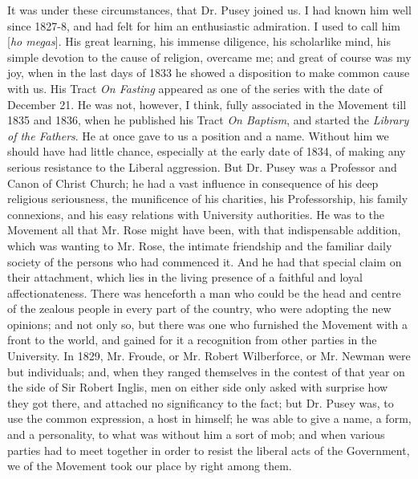 It was under these circumstances, that Dr. Pusey joined us. I had
known him well since 1827-8, and had felt for him an enthusiastic
admiration. I used to call him [\emph{ho megas}]. His great learning, his
immense diligence, his scholarlike mind, his simple devotion to the
cause of religion, overcame me; and great of course was my joy, when in
the last days of 1833 he showed a disposition to make common cause with
us. His Tract \emph{On Fasting} appeared as one of the series with the date of
December 21. He was not, however, I think, fully associated in the
Movement till 1835 and 1836, when he published his Tract \emph{On Baptism}, and
started the \emph{Library of the Fathers}. He at once gave to us a position and
a name. Without him we should have had little chance, especially
at the early date of 1834, of making any serious resistance to the
Liberal aggression. But Dr. Pusey was a Professor and Canon of Christ
Church; he had a vast influence in consequence of his deep religious
seriousness, the munificence of his charities, his Professorship, his
family connexions, and his easy relations with University authorities.
He was to the Movement all that Mr. Rose might have been, with that
indispensable addition, which was wanting to Mr. Rose, the intimate
friendship and the familiar daily society of the persons who had
commenced it. And he had that special claim on their attachment, which
lies in the living presence of a faithful and loyal affectionateness.
There was henceforth a man who could be the head and centre of the
zealous people in every part of the country, who were adopting the new
opinions; and not only so, but there was one who furnished the Movement
with a front to the world, and gained for it a recognition from other
parties in the University. In 1829, Mr. Froude, or Mr. Robert
Wilberforce, or Mr. Newman were but individuals; and, when they ranged
themselves in the contest of that year on the side of Sir Robert Inglis,
men on either side only asked with surprise how they got there, and
attached no significancy to the fact; but Dr. Pusey was, to use the
common expression, a host in himself; he was able to give a name, a
form, and a personality, to what was without him a sort of mob; and when
various parties had to meet together in order to resist the liberal acts
of the Government, we of the Movement took our place by right among
them.

